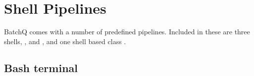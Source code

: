 \documentclass[letterpaper,10pt,english]{sphinxmanual}
\begin{document}
\begin{fulllineitems}

\begin{fulllineitems}
\label{api/terminal:batchq.core.terminal.VT100Interpreter.write}
\end{fulllineitems}


\begin{fulllineitems}
\label{api/terminal:batchq.core.terminal.VT100Interpreter.writeChar}
\end{fulllineitems}


\end{fulllineitems}


\begin{fulllineitems}
\label{api/terminal:batchq.core.terminal.convert_to_int}
\end{fulllineitems}



\section{Shell Pipelines}
\label{api/shell_terminals::doc}\label{api/shell_terminals:shell-pipelines}
BatchQ comes with a number of predefined pipelines. Included in these
are three shells, ,  and
, and one shell based class .


\subsection{Bash terminal}
\label{api/shell_terminals:bash-terminal}\label{api/shell_terminals:module-batchq.pipelines.shell.bash}
\end{document}
